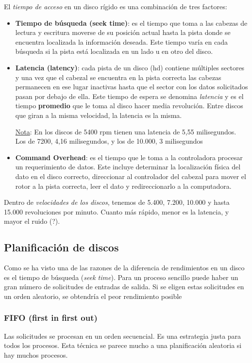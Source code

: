 \documentclass[10pt,a4paper]{article}
\begin{document}
El \textit{tiempo de acceso} en un disco rígido es una combinación de tres factores:
\begin{itemize}
\item \textbf{Tiempo de búsqueda (seek time)}: es el tiempo que toma a las cabezas de lectura y escritura moverse de su posición actual hasta la pista donde se encuentra localizada la información deseada. Este tiempo varía en cada búsqueda si la pista está localizada en un lado u en otro del disco.
\item \textbf{Latencia (latency)}: cada pista de un disco (hd) contiene múltiples sectores y una vez que el cabezal se encuentra en la pista correcta las cabezas permanecen en ese lugar inactivas hasta que el sector con los datos solicitados pasan por debajo de ella. Este tiempo de espera se denomina \textit{latencia} y es el tiempo \textbf{promedio} que le toma al disco hacer media revolución. Entre discos que giran a la misma velocidad, la latencia es la misma.

\underline{Nota}: En los discos de 5400 rpm tienen una latencia de 5,55 milisegundos. Los de 7200, 4,16 milisegundos, y los de 10.000, 3 milisegundos
\item \textbf{Command Overhead}: es el tiempo que le toma a la controladora procesar un requerimiento de datos. Este incluye determinar la localización física del dato en el disco correcto, direccionar al controlador del cabezal para mover el rotor a la pista correcta, leer el dato y redireccionarlo a la computadora.
\end{itemize}

Dentro de \textit{velocidades de los discos}, tenemos de 5.400, 7.200, 10.000 y hasta 15.000 revoluciones por minuto. Cuanto más rápido, menor es la latencia, y mayor el ruido (?).

\subsection{Planificación de discos}
Como se ha visto una de las razones de la diferencia de rendimientos en un disco es el tiempo de búsqueda (\textit{seek time}). Para un proceso sencillo puede haber un gran número de solicitudes de entradas de salida. Si se eligen estas solicitudes en un orden aleatorio, se obtendría el peor rendimiento posible

\subsubsection{FIFO (first in first out)}
Las solicitudes se procesan en un orden secuencial. Es una estrategia justa para todos los procesos. Esta técnica se parece mucho a una planificación aleatoria si hay muchos procesos.
\end{document}
